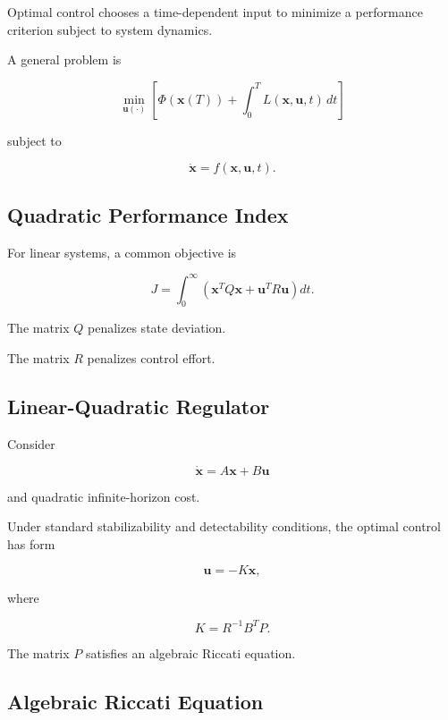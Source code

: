 Optimal control chooses a time-dependent input to minimize a performance
criterion subject to system dynamics.

A general problem is

\[
\boxed{
\min_{\mathbf{u}(\cdot)}
\left[
\Phi(\mathbf{x}(T))
+
\int_0^T
L(\mathbf{x},\mathbf{u},t)
\,dt
\right]
}
\]

subject to

\[
\boxed{
\dot{\mathbf{x}}
=
f(\mathbf{x},\mathbf{u},t).
}
\]

\subsection{Quadratic Performance Index}
\label{subsec:quadratic-performance-index}

For linear systems, a common objective is

\[
\boxed{
J
=
\int_0^\infty
\left(
\mathbf{x}^TQ\mathbf{x}
+
\mathbf{u}^TR\mathbf{u}
\right)
dt.
}
\]

The matrix \(Q\) penalizes state deviation.

The matrix \(R\) penalizes control effort.

\subsection{Linear-Quadratic Regulator}
\label{subsec:linear-quadratic-regulator}

Consider

\[
\dot{\mathbf{x}}
=
A\mathbf{x}
+
B\mathbf{u}
\]

and quadratic infinite-horizon cost.

Under standard stabilizability and detectability conditions, the optimal
control has form

\[
\boxed{
\mathbf{u}
=
-K\mathbf{x},
}
\]

where

\[
\boxed{
K
=
R^{-1}B^TP.
}
\]

The matrix \(P\) satisfies an algebraic Riccati equation.

\subsection{Algebraic Riccati Equation}
\label{subsec:algebraic-riccati-equation}


